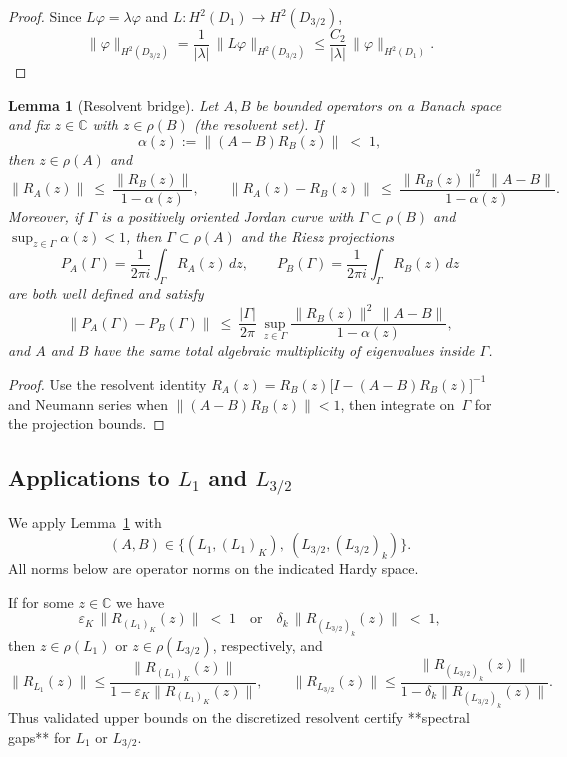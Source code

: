 \documentclass[11pt]{article}
\newtheorem{lemma}[definition]{Lemma}
\begin{document}
\begin{proof}
Since $L\varphi=\lambda\varphi$ and $L:H^2(D_1)\to H^2(D_{3/2})$,
\[
\|\varphi\|_{H^2(D_{3/2})}
=\frac{1}{|\lambda|}\,\|L\varphi\|_{H^2(D_{3/2})}
\le \frac{C_2}{|\lambda|}\,\|\varphi\|_{H^2(D_1)}.
\]
\end{proof}


\begin{lemma}[Resolvent bridge]\label{lem:resolvent-bridge}
Let $A,B$ be bounded operators on a Banach space and fix $z\in\mathbb{C}$ with
$z\in\rho(B)$ (the resolvent set). If
\[
\alpha(z):=\|(A-B)R_B(z)\|\;<\;1,
\]
then $z\in\rho(A)$ and
\begin{equation}\label{eq:resolvent-bridge-bounds}
\|R_A(z)\|\ \le\ \frac{\|R_B(z)\|}{1-\alpha(z)},
\qquad
\|R_A(z)-R_B(z)\|
\ \le\ \frac{\|R_B(z)\|^2\,\|A-B\|}{1-\alpha(z)}.
\end{equation}
Moreover, if $\Gamma$ is a positively oriented Jordan curve with $\Gamma\subset\rho(B)$
and $\sup_{z\in\Gamma}\alpha(z)<1$, then $\Gamma\subset\rho(A)$ and the Riesz projections
\[
P_A(\Gamma)=\frac{1}{2\pi i}\int_\Gamma R_A(z)\,dz,\qquad
P_B(\Gamma)=\frac{1}{2\pi i}\int_\Gamma R_B(z)\,dz
\]
are both well defined and satisfy
\begin{equation}\label{eq:proj-diff}
\|P_A(\Gamma)-P_B(\Gamma)\|
\ \le\ \frac{|\Gamma|}{2\pi}\ \sup_{z\in\Gamma}
\frac{\|R_B(z)\|^2\,\|A-B\|}{1-\alpha(z)},
\end{equation}
and $A$ and $B$ have the same total algebraic multiplicity of eigenvalues inside $\Gamma$.
\end{lemma}

\begin{proof}
Use the resolvent identity $R_A(z)=R_B(z)\bigl[I-(A-B)R_B(z)\bigr]^{-1}$ and Neumann
series when $\|(A-B)R_B(z)\|<1$, then integrate on~$\Gamma$ for the projection bounds.
\end{proof}

\subsection*{Applications to $L_{1}$ and $L_{3/2}$}

We apply Lemma~\ref{lem:resolvent-bridge} with
\[
(A,B)\in\bigl\{(L_{1},(L_{1})_{K}),\ (L_{3/2},(L_{3/2})_{k})\bigr\}.
\]
All norms below are operator norms on the indicated Hardy space.

If for some $z\in\mathbb{C}$ we have
\[
\varepsilon_{K}\,\bigl\|R_{(L_{1})_{K}}(z)\bigr\| \;<\; 1
\quad\text{or}\quad
\delta_{k}\,\bigl\|R_{(L_{3/2})_{k}}(z)\bigr\| \;<\; 1,
\]
then $z\in\rho(L_{1})$ or $z\in\rho(L_{3/2})$, respectively, and
\[
\|R_{L_{1}}(z)\|
\le \frac{\|R_{(L_{1})_{K}}(z)\|}{1-\varepsilon_K\|R_{(L_{1})_{K}}(z)\|},
\qquad
\|R_{L_{3/2}}(z)\|
\le \frac{\|R_{(L_{3/2})_{k}}(z)\|}{1-\delta_k\|R_{(L_{3/2})_{k}}(z)\|}.
\]
Thus validated upper bounds on the discretized resolvent certify **spectral gaps** for
$L_{1}$ or $L_{3/2}$.
\end{document}
